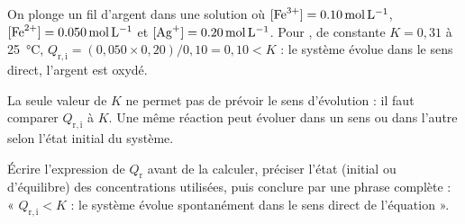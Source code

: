 \begin{exemple}
On plonge un fil d'argent dans une solution où $[\ce{Fe^3+}]=\qty{0,10}{mol.L^{-1}}$, $[\ce{Fe^2+}]=\qty{0,050}{mol.L^{-1}}$
et $[\ce{Ag+}]=\qty{0,20}{mol.L^{-1}}$. Pour , de constante $K=0{,}31$ à 25~°C,
$Q_{\mathrm{r},\mathrm{i}}=(0{,}050\times0{,}20)/0{,}10=0{,}10<K$ : le système évolue dans le sens direct, l'argent est oxydé.
\end{exemple}
\begin{attention}
La seule valeur de $K$ ne permet pas de prévoir le sens d'évolution : il faut comparer $Q_{\mathrm{r},\mathrm{i}}$ à $K$.
Une même réaction peut évoluer dans un sens ou dans l'autre selon l'état initial du système.
\end{attention}
\begin{rediger}
Écrire l'expression de $Q_\mathrm{r}$ avant de la calculer, préciser l'état (initial ou d'équilibre) des concentrations
utilisées, puis conclure par une phrase complète : « $Q_{\mathrm{r},\mathrm{i}}<K$ : le système évolue spontanément dans le
sens direct de l'équation ».
\end{rediger}
\exercices


